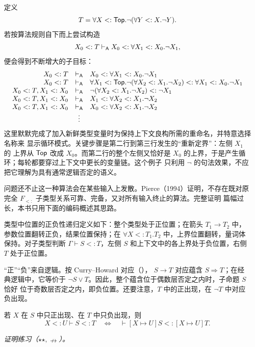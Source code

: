定义
\[
T=\forall X<:\mathsf{Top}.
  \neg(\forall Y<:X.\neg Y).
\]
若按算法规则自下而上尝试构造
\[
X_0<:T\mathrel{\vdash_{\mathsf A}}
X_0<:\forall X_1<:X_0.\neg X_1,
\]
便会得到不断增大的子目标：
\[
\begin{array}{rcl}
X_0<:T
&\mathrel{\vdash_{\mathsf A}}&X_0<:\forall X_1<:X_0.\neg X_1\\
X_0<:T
&\mathrel{\vdash_{\mathsf A}}&
\forall X_1<:\mathsf{Top}.
 \neg(\forall X_2<:X_1.\neg X_2)
<:\forall X_1<:X_0.\neg X_1\\
X_0<:T,X_1<:X_0
&\mathrel{\vdash_{\mathsf A}}&
\neg(\forall X_2<:X_1.\neg X_2)<:\neg X_1\\
X_0<:T,X_1<:X_0
&\mathrel{\vdash_{\mathsf A}}&X_1<:\forall X_2<:X_1.\neg X_2\\
X_0<:T,X_1<:X_0
&\mathrel{\vdash_{\mathsf A}}&X_0<:\forall X_2<:X_1.\neg X_2\\
&\vdots&
\end{array}
\]
这里默默完成了加入新鲜类型变量时为保持上下文良构所需的重命名，并特意选择名称来
显示循环模式。关键步骤是第二行到第三行发生的“重新定界”：左侧 \(X_1\) 的
上界从 \(\mathsf{Top}\) 改成 \(X_0\)。而第二行的整个左侧又恰好是
\(X_0\) 的上界，于是产生循环；每轮都要穿过上下文中更长的变量链。这个例子
只利用 \(\neg\) 的句法效果，不应把它理解为具有通常逻辑否定的语义。

问题还不止这一种算法会在某些输入上发散。Pierce（1994）证明，不存在既对原
完全 \(F_{<:}\) 子类型关系可靠、完备，又对所有输入终止的算法。完整证明
篇幅过长，本书只用下面的编码概述其思路。

\begin{definition}
\label{def:28.5.3}
类型中位置的正负性递归定义如下：整个类型处于正位置；在箭头
\(T_1\to T_2\) 中，参数位置翻转正负，结果位置保持；在
\(\forall X<:T_1.T_2\) 中，上界位置翻转，量词体保持。对子类型判断
\(\Gamma\vdash S<:T\)，左侧 \(S\) 和上下文中的各上界处于负位置，右侧
\(T\) 处于正位置。
\end{definition}

“正”“负”来自逻辑。按 Curry--Howard 对应（），
\(S\to T\) 对应蕴含 \(S\Rightarrow T\)；在经典逻辑中，它等价于
\(\neg S\lor T\)。因此，整个蕴含位于偶数层否定之内时，子命题 \(S\) 恰好
位于奇数层否定之内，即负位置。还要注意，\(T\) 中的正出现，在 \(\neg T\)
中对应负出现。

\begin{fact}
\label{fact:28.5.4}
若 \(X\) 在 \(S\) 中只正出现、在 \(T\) 中只负出现，则
\[
X<:U\vdash S<:T
\quad\Longleftrightarrow\quad
\vdash[X\mapsto U]S<:[X\mapsto U]T.
\]
\end{fact}
\noindent\textit{证明练习（\(\star\star,\nrightarrow\)）。}

